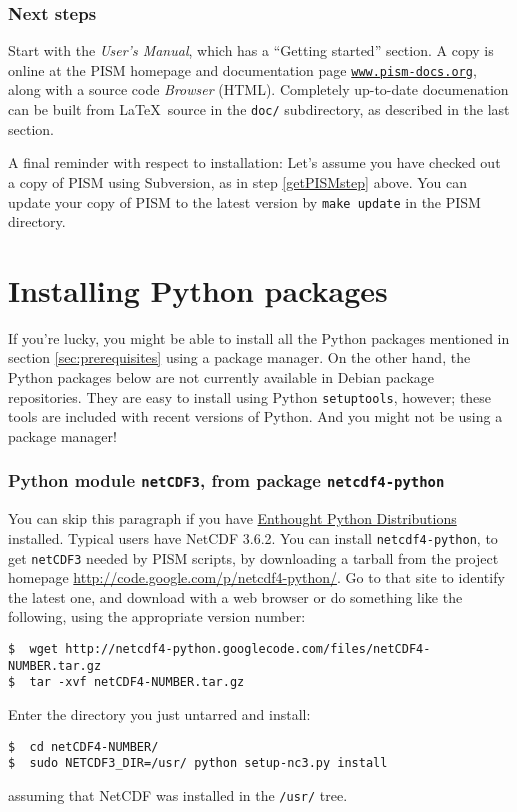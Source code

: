 \documentclass[11pt,final]{amsart}
\renewcommand{\t}[1]{\texttt{#1}}
\begin{document}
\subsubsection*{Next steps}  Start with the \emph{User's Manual}, which has a ``Getting started'' section.  A copy is online at the PISM homepage and documentation page \href{http://www.pism-docs.org/}{\t{www.pism-docs.org}}, along with a source code \emph{Browser} (HTML).  Completely up-to-date documenation can be built from \LaTeX~source in the \texttt{doc/} subdirectory, as described in the last section.

A final reminder with respect to installation:  Let's assume you have checked out a copy of PISM using Subversion, as in step \ref{getPISMstep} above.  You can update your copy of PISM to the latest version by \texttt{make update} in the PISM directory.


\newpage
\section{Installing Python packages}
\label{sec:python}

If you're lucky, you might be able to install all the Python packages mentioned in section \ref{sec:prerequisites} using a package manager. On the other hand, the Python packages below are not currently available in Debian package repositories. They are easy to install using Python \texttt{setuptools}, however; these tools are included with recent versions of Python.  And you might not be using a package manager!

\subsubsection*{Python module \texttt{netCDF3}, from package \texttt{netcdf4-python}}  You can skip this paragraph if you have \href{http://www.enthought.com/}{Enthought Python Distributions} installed. Typical users have NetCDF 3.6.2.  You can install \texttt{netcdf4-python}, to get \texttt{netCDF3} needed by PISM scripts, by downloading a tarball from the project homepage \url{http://code.google.com/p/netcdf4-python/}.  Go to that site to identify the latest one, and download with a web browser or do something like the following, using the appropriate version number:
\begin{verbatim}
$  wget http://netcdf4-python.googlecode.com/files/netCDF4-NUMBER.tar.gz
$  tar -xvf netCDF4-NUMBER.tar.gz
\end{verbatim}
Enter the directory you just untarred and install:
\begin{verbatim}
$  cd netCDF4-NUMBER/
$  sudo NETCDF3_DIR=/usr/ python setup-nc3.py install
\end{verbatim}
assuming that NetCDF was installed in the \texttt{/usr/} tree.
\end{document}
